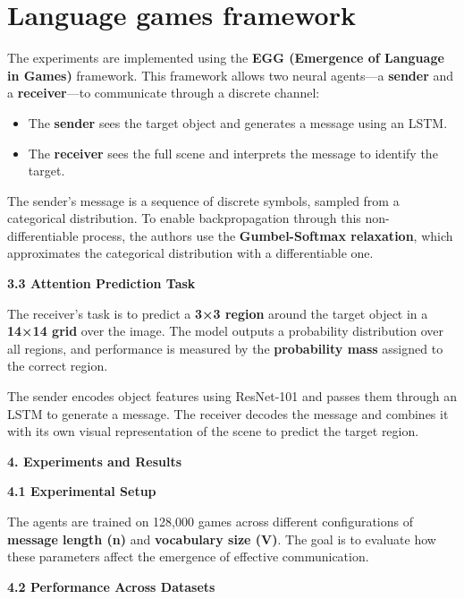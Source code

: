 \documentclass[11pt]{article}
\def\tightlist{} %
\begin{document}
\section{Language games framework}

The experiments are implemented using the \textbf{EGG (Emergence of
Language in Games)} framework. This framework allows two neural
agents---a \textbf{sender} and a \textbf{receiver}---to communicate
through a discrete channel:

\begin{itemize}
\tightlist
\item
  The \textbf{sender} sees the target object and generates a message
  using an LSTM.
\item
  The \textbf{receiver} sees the full scene and interprets the message
  to identify the target.
\end{itemize}

The sender's message is a sequence of discrete symbols, sampled from a
categorical distribution. To enable backpropagation through this
non-differentiable process, the authors use the \textbf{Gumbel-Softmax
relaxation}, which approximates the categorical distribution with a
differentiable one.

\textbf{3.3 Attention Prediction Task}

The receiver's task is to predict a \textbf{3×3 region} around the
target object in a \textbf{14×14 grid} over the image. The model outputs
a probability distribution over all regions, and performance is measured
by the \textbf{probability mass} assigned to the correct region.

The sender encodes object features using ResNet-101 and passes them
through an LSTM to generate a message. The receiver decodes the message
and combines it with its own visual representation of the scene to
predict the target region.

\textbf{4. Experiments and Results}

\textbf{4.1 Experimental Setup}

The agents are trained on 128,000 games across different configurations
of \textbf{message length (n)} and \textbf{vocabulary size (V)}. The
goal is to evaluate how these parameters affect the emergence of
effective communication.

\textbf{4.2 Performance Across Datasets}
\end{document}
